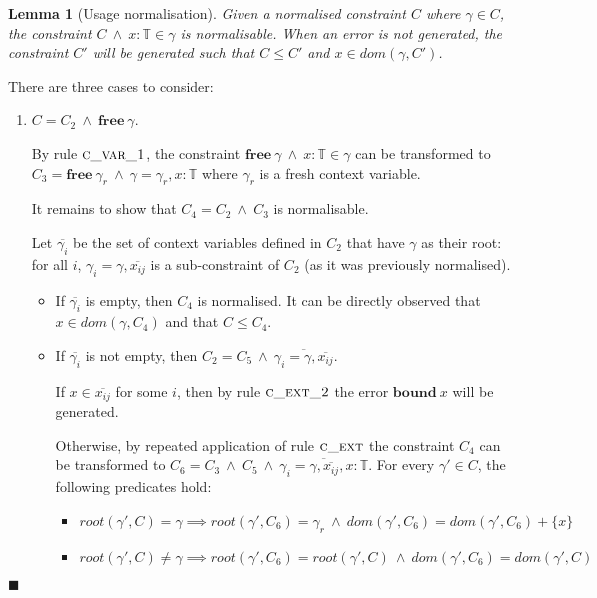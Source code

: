 \documentclass[preprint]{sigplanconf}
\newtheorem{lem}{Lemma}
\newcommand{\cand}{\:\wedge\:}
\newcommand{\free}[1]{\mathbf{free}\:#1}
\newcommand{\tinf}{\mathbb{T}}
\newcommand{\qed}{$\blacksquare$}
\newenvironment{proof}{\vspace{1ex}\noindent{\bf Proof}\hspace{0.5em}}
  {\hfill\qed\vspace{1ex}}
\begin{document}
\begin{lem}[Usage normalisation]
\label{lem:norm_usage}
Given a normalised constraint $C$ where $\gamma \in C$, the constraint 
$C \cand x : \tinf \in \gamma$ is normalisable. When an error is not generated, 
the constraint $C'$ will be generated such that $C \leq C'$ and
$x \in dom(\gamma, C')$.
\end{lem}
\begin{proof}

There are three cases to consider:

\begin{enumerate}
\item $C = C_2 \cand \free{\gamma}$.

By rule $\textsc{c\_var\_1}$, the constraint
$\free{\gamma} \cand x : \tinf \in \gamma$ can be transformed to 
$C_3 = \free{\gamma_r} \cand \gamma = \gamma_r, x : \tinf$ where
$\gamma_r$ is a fresh context variable.

It remains to show that $C_4 = C_2 \cand C_3$ is normalisable.

Let $\overline{\gamma_i}$ be the set of context variables defined in
$C_2$ that have $\gamma$ as their root: for all $i$, $\gamma_i = \gamma, \overline{x_{ij}}$ is
a sub-constraint of $C_2$ (as it was previously normalised).

\begin{itemize}
\item If $\overline{\gamma_i}$ is empty, then $C_4$ is normalised.
It can be directly observed that $x \in dom(\gamma, C_4)$ and that
$C \leq C_4$.

\item If $\overline{\gamma_i}$ is not empty, then
$C_2 = C_5 \cand \overline{\gamma_i = \gamma, \overline{x_{ij}}}$.

If $x \in \overline{x_{ij}}$ for some $i$, then by rule $\textsc{c\_ext\_2}$
the error $\mathbf{bound}\:x$ will be generated.

Otherwise, by repeated application of rule $\textsc{c\_ext}$ the constraint
$C_4$ can be transformed to $C_6 = C_3 \cand C_5 \cand \overline{\gamma_i = \gamma, \overline{x_{ij}}, x : \tinf}$. For every $\gamma' \in C$, 
the following predicates hold:
\begin{itemize}
\item $root(\gamma', C) = \gamma \implies root(\gamma', C_6) = \gamma_r \cand dom(\gamma', C_6) = dom(\gamma', C_6) + \{x\}$
\item $root(\gamma', C) \neq \gamma \implies root(\gamma', C_6) = root(\gamma', C) \cand dom(\gamma', C_6) = dom(\gamma', C)$
\end{itemize}


\end{itemize}
\end{enumerate}
\end{proof}
\end{document}
